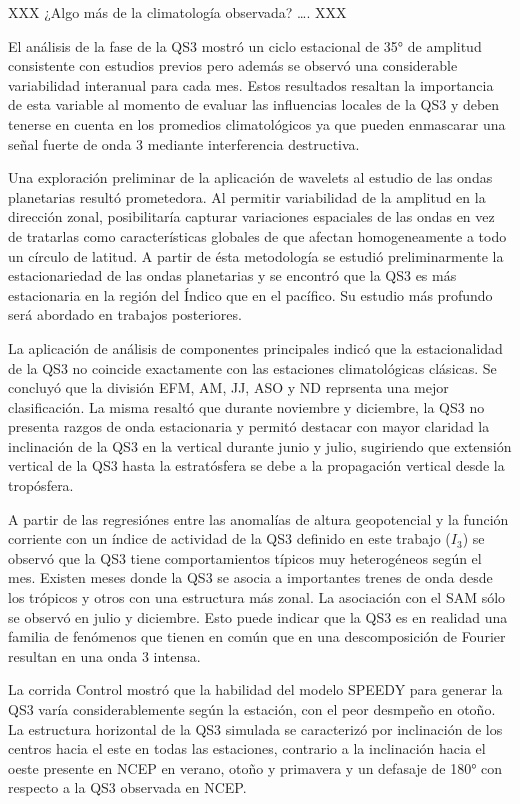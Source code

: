 \documentclass[spanish,a4paper,12pt,oneside]{book}
\begin{document}
XXX ¿Algo más de la climatología observada? \ldots{}. XXX

El análisis de la fase de la QS3 mostró un ciclo estacional de 35° de
amplitud consistente con estudios previos pero además se observó una
considerable variabilidad interanual para cada mes. Estos resultados
resaltan la importancia de esta variable al momento de evaluar las
influencias locales de la QS3 y deben tenerse en cuenta en los promedios
climatológicos ya que pueden enmascarar una señal fuerte de onda 3
mediante interferencia destructiva.

Una exploración preliminar de la aplicación de wavelets al estudio de
las ondas planetarias resultó prometedora. Al permitir variabilidad de
la amplitud en la dirección zonal, posibilitaría capturar variaciones
espaciales de las ondas en vez de tratarlas como características
globales de que afectan homogeneamente a todo un círculo de latitud. A
partir de ésta metodología se estudió preliminarmente la estacionariedad
de las ondas planetarias y se encontró que la QS3 es más estacionaria en
la región del Índico que en el pacífico. Su estudio más profundo será
abordado en trabajos posteriores.

La aplicación de análisis de componentes principales indicó que la
estacionalidad de la QS3 no coincide exactamente con las estaciones
climatológicas clásicas. Se concluyó que la división EFM, AM, JJ, ASO y
ND reprsenta una mejor clasificación. La misma resaltó que durante
noviembre y diciembre, la QS3 no presenta razgos de onda estacionaria y
permitó destacar con mayor claridad la inclinación de la QS3 en la
vertical durante junio y julio, sugiriendo que extensión vertical de la
QS3 hasta la estratósfera se debe a la propagación vertical desde la
tropósfera.

A partir de las regresiónes entre las anomalías de altura geopotencial y
la función corriente con un índice de actividad de la QS3 definido en
este trabajo (\(I_3\)) se observó que la QS3 tiene comportamientos
típicos muy heterogéneos según el mes. Existen meses donde la QS3 se
asocia a importantes trenes de onda desde los trópicos y otros con una
estructura más zonal. La asociación con el SAM sólo se observó en julio
y diciembre. Esto puede indicar que la QS3 es en realidad una familia de
fenómenos que tienen en común que en una descomposición de Fourier
resultan en una onda 3 intensa.

La corrida Control mostró que la habilidad del modelo SPEEDY para
generar la QS3 varía considerablemente según la estación, con el peor
desmpeño en otoño. La estructura horizontal de la QS3 simulada se
caracterizó por inclinación de los centros hacia el este en todas las
estaciones, contrario a la inclinación hacia el oeste presente en NCEP
en verano, otoño y primavera y un defasaje de 180° con respecto a la QS3
observada en NCEP.
\end{document}
